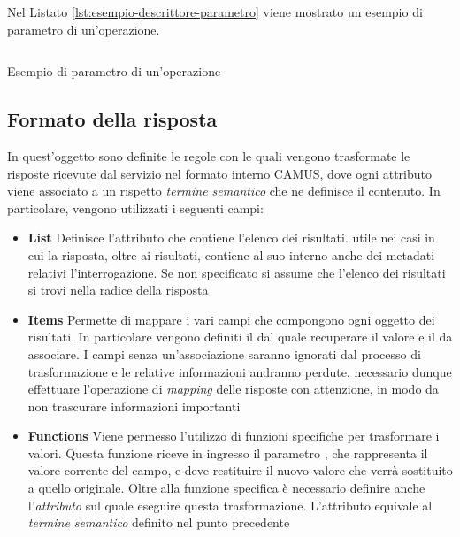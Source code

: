 Nel Listato \ref{lst:esempio-descrittore-parametro} viene mostrato un esempio di parametro di un'operazione.

\begin{listing}[h]
	\inputminted{json}{5-implementazione-backend/Codice/esempio_descrittore_parametro.json}
	\caption{Esempio di parametro di un'operazione}
	\label{lst:esempio-descrittore-parametro}
\end{listing}

\subsection{Formato della risposta\label{sec:descrittore-risposta}}

In quest'oggetto sono definite le regole con le quali vengono trasformate le risposte ricevute dal servizio nel formato interno CAMUS, dove ogni attributo viene associato a un rispetto \emph{termine semantico} che ne definisce il contenuto. In particolare, vengono utilizzati i seguenti campi:

\begin{itemize}
	\item \textbf{List}
	Definisce l'attributo che contiene l'elenco dei risultati. \upe utile nei casi in cui la risposta, oltre ai risultati, contiene al suo interno anche dei metadati relativi l'interrogazione. Se non specificato si assume che l'elenco dei risultati si trovi nella radice della risposta
	\item \textbf{Items}
	Permette di mappare i vari campi che compongono ogni oggetto dei risultati. In particolare vengono definiti il  dal quale recuperare il valore e il  da associare. I campi senza un'associazione saranno ignorati dal processo di trasformazione e le relative informazioni andranno perdute. \upe necessario dunque effettuare l'operazione di \emph{mapping} delle risposte con attenzione, in modo da non trascurare informazioni importanti
	\item \textbf{Functions}
	Viene permesso l'utilizzo di funzioni specifiche per trasformare i valori. Questa funzione riceve in ingresso il parametro , che rappresenta il valore corrente del campo, e deve restituire il nuovo valore che verrà sostituito a quello originale. Oltre alla funzione specifica è necessario definire anche l'\emph{attributo} sul quale eseguire questa trasformazione. L'attributo equivale al \emph{termine semantico} definito nel punto precedente
\end{itemize}

